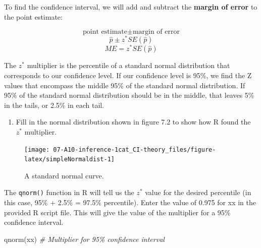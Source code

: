 \documentclass[
]{report}
\newenvironment{Shaded}{\begin{snugshade}}{\end{snugshade}}
\newcommand{\CommentTok}[1]{\textcolor[rgb]{0.56,0.35,0.01}{\textit{#1}}}
\newcommand{\FunctionTok}[1]{\textcolor[rgb]{0.00,0.00,0.00}{#1}}
\newcommand{\NormalTok}[1]{#1}
\providecommand{\tightlist}{%
  \setlength{\itemsep}{0pt}\setlength{\parskip}{0pt}}
\begin{document}
\vspace{0.5in}

To find the confidence interval, we will add and subtract the \textbf{margin of error} to the point estimate:

\[\text{point estimate}\pm\text{margin of error}\]
\[\hat{p}\pm z^* SE(\hat{p})\]
\[ME = z^* SE(\hat{p})\]

The \(z^*\) multiplier is the percentile of a standard normal distribution that corresponds to our confidence level. If our confidence level is 95\%, we find the Z values that encompass the middle 95\% of the standard normal distribution. If 95\% of the standard normal distribution should be in the middle, that leaves 5\% in the tails, or 2.5\% in each tail.

\begin{enumerate}
\def\labelenumi{\arabic{enumi}.}
\setcounter{enumi}{1}
\tightlist
\item
  Fill in the normal distribution shown in figure 7.2 to show how R found the \(z^*\) multiplier.
\end{enumerate}

\begin{figure}

{\centering \texttt{[image: 07-A10-inference-1cat\_CI-theory\_files/figure-latex/simpleNormaldist-1]} 

}

\caption{A standard normal curve.}\label{fig:simpleNormaldist}
\end{figure}

The \texttt{qnorm()} function in R will tell us the \(z^*\) value for the desired percentile (in this case, 95\% + 2.5\% = 97.5\% percentile). Enter the value of 0.975 for xx in the provided R script file. This will give the value of the multiplier for a 95\% confidence interval.

\begin{Shaded}
\begin{Highlighting}[]
\FunctionTok{qnorm}\NormalTok{(xx) }\CommentTok{\# Multiplier for 95\% confidence interval}
\end{Highlighting}
\end{Shaded}
\end{document}
